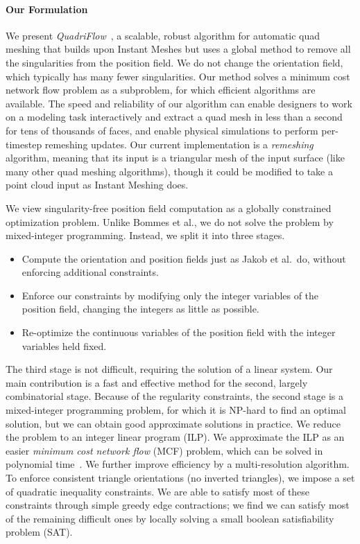 \paragraph*{Our Formulation} We present \emph{QuadriFlow}~\cite{huang2018quadriflow}, a scalable, robust algorithm for automatic quad meshing that builds upon Instant Meshes but uses a global method to remove all the singularities from the position field.
We do not change the orientation field, which typically has many fewer singularities. Our method solves a minimum cost network flow problem as a subproblem, for which efficient algorithms are available. The speed and reliability of our algorithm can enable designers to work on a modeling task interactively and extract a quad mesh in less than a second for tens of thousands of faces, and enable physical simulations to perform per-timestep remeshing updates. Our current implementation is a \emph{remeshing} algorithm, meaning that its input is a triangular mesh of the input surface (like many other quad meshing algorithms), though it could be modified to take a point cloud input as Instant Meshing does.

We view singularity-free position field computation as a globally constrained optimization problem.
Unlike Bommes et al., we do not solve the problem by mixed-integer programming. Instead, we split it into three stages.
\begin{itemize}
\item Compute the orientation and position fields just as Jakob et al.\ do, without enforcing additional constraints.
\item Enforce our constraints by modifying only the integer variables of the position field, changing the integers as little as possible.
\item Re-optimize the continuous variables of the position field with the integer variables held fixed.
\end{itemize}
The third stage is not difficult, requiring the solution of a linear system. Our main contribution is a fast and effective method for the second, largely combinatorial stage. Because of the regularity constraints, the second stage is a mixed-integer programming problem, for which it is NP-hard to find an optimal solution, but we can obtain good approximate solutions in practice. We reduce the problem to an integer linear program (ILP). We approximate the ILP as an easier \emph{minimum cost network flow} (MCF) problem, which can be solved in polynomial time~\cite{klein1967primal}. We further improve efficiency by a multi-resolution algorithm. To enforce consistent triangle orientations (no inverted triangles), we impose a set of quadratic inequality constraints. We are able to satisfy most of these constraints through simple greedy edge contractions; we find we can satisfy most of the remaining difficult ones by locally solving a small boolean satisfiability problem (SAT).

